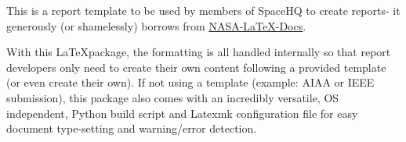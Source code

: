 
This is a report template to be used by members of SpaceHQ to create reports- it generously (or shamelessly)
borrows from \href{https://nasa.github.io/nasa-latex-docs/html/}{NASA-\LaTeX-Docs}.

With this \LaTeX package, the formatting is all handled internally so that report developers only need to
create their own content following a provided template (or even create their own). If not using a template
(example: AIAA or IEEE submission), this package also comes with an incredibly versatile, OS independent,
Python build script and Latexmk configuration file for easy document type-setting and warning/error detection.
